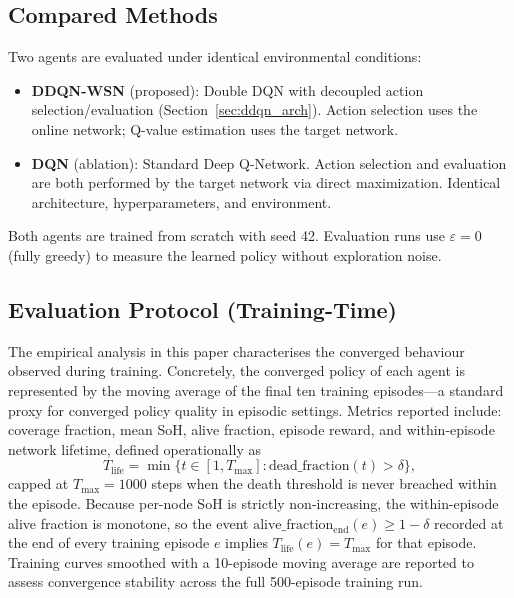 \documentclass[journal]{IEEEtran}
\begin{document}
\subsection{Compared Methods}

Two agents are evaluated under identical environmental conditions:

\begin{itemize}
  \item \textbf{DDQN-WSN} (proposed): Double DQN with decoupled action
    selection/evaluation (Section~\ref{sec:ddqn_arch}). Action
    selection uses the online network; Q-value estimation uses the
    target network.
  \item \textbf{DQN} (ablation): Standard Deep Q-Network. Action
    selection and evaluation are both performed by the target network via
    direct maximization. Identical architecture, hyperparameters, and
    environment.
\end{itemize}

Both agents are trained from scratch with seed 42. Evaluation runs use
$\varepsilon = 0$ (fully greedy) to measure the learned policy without
exploration noise.

\subsection{Evaluation Protocol (Training-Time)}
\label{sec:eval_protocol}

The empirical analysis in this paper characterises the converged
behaviour observed during training. Concretely, the converged policy
of each agent is represented by the moving average of the final ten
training episodes---a standard proxy for converged policy quality in
episodic settings. Metrics reported include: coverage fraction, mean
SoH, alive fraction, episode reward, and within-episode network
lifetime, defined operationally as
\begin{equation}
  T_{\text{life}} = \min\!\big\{ t \in [1, T_{\max}] :
  \text{dead\_fraction}(t) > \delta \big\},
  \label{eq:lifetime}
\end{equation}
capped at $T_{\max} = 1000$ steps when the death threshold is never
breached within the episode. Because per-node SoH is strictly
non-increasing, the within-episode alive fraction is monotone, so the
event $\text{alive\_fraction}_{\text{end}}(e) \geq 1 - \delta$
recorded at the end of every training episode $e$ implies
$T_{\text{life}}(e) = T_{\max}$ for that episode. Training curves
smoothed with a 10-episode moving average are reported to assess
convergence stability across the full 500-episode training run.
\end{document}

